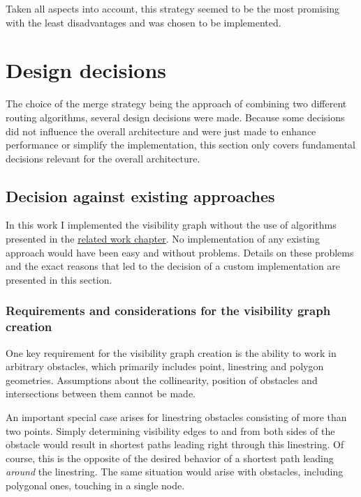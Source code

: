 		Taken all aspects into account, this strategy seemed to be the most promising with the least disadvantages and was chosen to be implemented.

\section{Design decisions}
\label{sec:design-decisions}

	The choice of the merge strategy being the approach of combining two different routing algorithms, several design decisions were made.
	Because some decisions did not influence the overall architecture and were just made to enhance performance or simplify the implementation, this section only covers fundamental decisions relevant for the overall architecture.
	
	\subsection{Decision against existing approaches}
	\label{subsec:decision-against-existing-approaches}
	
		In this work I implemented the visibility graph without the use of algorithms presented in the \hyperref[chap:related-work]{related work chapter}.
		No implementation of any existing approach would have been easy and without problems.
		Details on these problems and the exact reasons that led to the decision of a custom implementation are presented in this section.
		
		\subsubsection{Requirements and considerations for the visibility graph creation}
		
			One key requirement for the visibility graph creation is the ability to work in arbitrary obstacles, which primarily includes point, linestring and polygon geometries.
			Assumptions about the collinearity, position of obstacles and intersections between them cannot be made.
			
			An important special case arises for linestring obstacles consisting of more than two points.
			Simply determining visibility edges to and from both sides of the obstacle would result in shortest paths leading right through this linestring.
			Of course, this is the opposite of the desired behavior of a shortest path leading \emph{around} the linestring.
			The same situation would arise with obstacles, including polygonal ones, touching in a single node.
			
